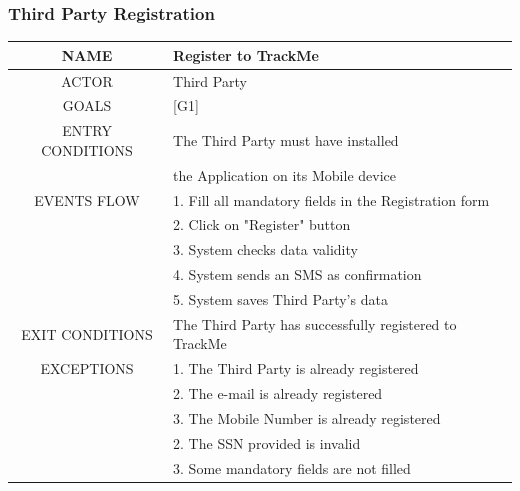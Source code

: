 \documentclass[12pt,a4paper]{article}
\begin{document}
	\subsubsection{Third Party Registration }
	\begin{center}
		\begin{tabular}{| c | l |}
			\hline
			NAME & Register to TrackMe \\
			\hline
			ACTOR & Third Party \\
			\hline
			GOALS & [G1] \\
			\hline
			ENTRY CONDITIONS & The Third Party must have installed \\
			&	the Application on its Mobile device \\ \hline
			EVENTS FLOW  &
			1. Fill all mandatory fields in the Registration form\\
			&2. Click on "Register" button\\
			&3. System checks data validity\\
			&4. System sends an SMS as confirmation\\
			&5. System saves Third Party's data\\
			\hline
			EXIT CONDITIONS  & The Third Party has successfully registered to TrackMe \\ \hline
			EXCEPTIONS & 
			1. The Third Party is already registered\\
			&2. The e-mail is already registered\\
			&3. The Mobile Number is already registered\\
			&2. The SSN provided is invalid\\
			&3. Some mandatory fields are not filled\\
			\hline
		\end{tabular}
	\end{center}
\end{document}
